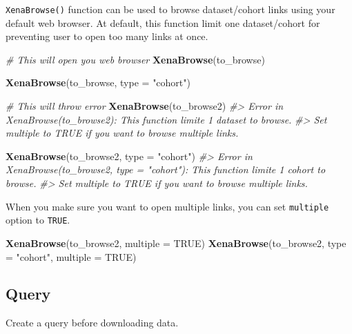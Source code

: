 \documentclass[nofonts,]{tufte-handout}
\newenvironment{Shaded}{\begin{snugshade}}{\end{snugshade}}
\newcommand{\CommentTok}[1]{\textcolor[rgb]{0.56,0.35,0.01}{\textit{#1}}}
\newcommand{\DataTypeTok}[1]{\textcolor[rgb]{0.13,0.29,0.53}{#1}}
\newcommand{\KeywordTok}[1]{\textcolor[rgb]{0.13,0.29,0.53}{\textbf{#1}}}
\newcommand{\NormalTok}[1]{#1}
\newcommand{\OtherTok}[1]{\textcolor[rgb]{0.56,0.35,0.01}{#1}}
\newcommand{\StringTok}[1]{\textcolor[rgb]{0.31,0.60,0.02}{#1}}
\begin{document}
\texttt{XenaBrowse()} function can be used to browse dataset/cohort
links using your default web browser. At default, this function limit
one dataset/cohort for preventing user to open too many links at once.

\begin{Shaded}
\begin{Highlighting}[]
\CommentTok{# This will open you web browser}
\KeywordTok{XenaBrowse}\NormalTok{(to_browse)}

\KeywordTok{XenaBrowse}\NormalTok{(to_browse, }\DataTypeTok{type =} \StringTok{"cohort"}\NormalTok{)}
\end{Highlighting}
\end{Shaded}

\begin{Shaded}
\begin{Highlighting}[]
\CommentTok{# This will throw error}
\KeywordTok{XenaBrowse}\NormalTok{(to_browse2)}
\CommentTok{#> Error in XenaBrowse(to_browse2): This function limite 1 dataset to browse.}
\CommentTok{#>  Set multiple to TRUE if you want to browse multiple links.}

\KeywordTok{XenaBrowse}\NormalTok{(to_browse2, }\DataTypeTok{type =} \StringTok{"cohort"}\NormalTok{)}
\CommentTok{#> Error in XenaBrowse(to_browse2, type = "cohort"): This function limite 1 cohort to browse. }
\CommentTok{#>  Set multiple to TRUE if you want to browse multiple links.}
\end{Highlighting}
\end{Shaded}

When you make sure you want to open multiple links, you can set
\texttt{multiple} option to \texttt{TRUE}.

\begin{Shaded}
\begin{Highlighting}[]
\KeywordTok{XenaBrowse}\NormalTok{(to_browse2, }\DataTypeTok{multiple =} \OtherTok{TRUE}\NormalTok{)}
\KeywordTok{XenaBrowse}\NormalTok{(to_browse2, }\DataTypeTok{type =} \StringTok{"cohort"}\NormalTok{, }\DataTypeTok{multiple =} \OtherTok{TRUE}\NormalTok{)}
\end{Highlighting}
\end{Shaded}

\hypertarget{query}{%
\subsection{Query}\label{query}}

Create a query before downloading data.
\end{document}
